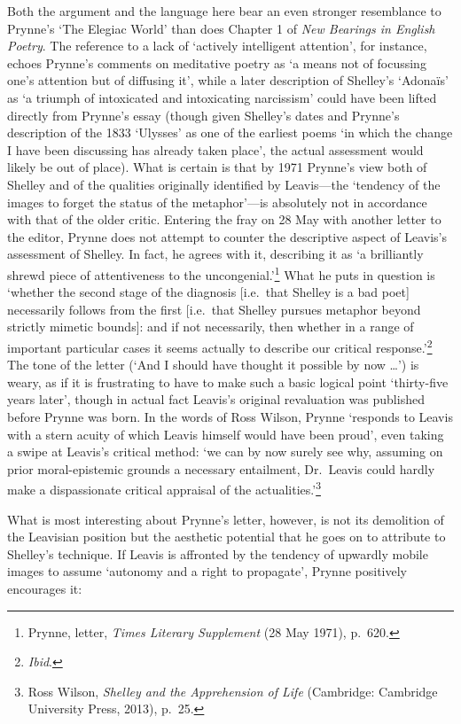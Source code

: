 \documentclass[]{article}
\begin{document}
\noindent Both the argument and the language here bear an even stronger
resemblance to Prynne's `The Elegiac World' than does Chapter 1 of
\emph{New Bearings in English Poetry}. The reference to a lack of
`actively intelligent attention', for instance, echoes Prynne's comments
on meditative poetry as `a means not of focussing one's attention but of
diffusing it', while a later description of Shelley's `Adonaïs' as `a
triumph of intoxicated and intoxicating narcissism' could have been
lifted directly from Prynne's essay (though given Shelley's dates and
Prynne's description of the 1833 `Ulysses' as one of the earliest poems
`in which the change I have been discussing has already taken place',
the actual assessment would likely be out of place). What is certain is
that by 1971 Prynne's view both of Shelley and of the qualities
originally identified by Leavis---the `tendency of the images to forget
the status of the metaphor'---is absolutely not in accordance with that
of the older critic. Entering the fray on 28 May with another letter to
the editor, Prynne does not attempt to counter the descriptive aspect of
Leavis's assessment of Shelley. In fact, he agrees with it, describing
it as `a brilliantly shrewd piece of attentiveness to the
uncongenial.'\footnote{Prynne, letter, \emph{Times Literary Supplement}
  (28 May 1971), p.~620.} What he puts in question is `whether the
second stage of the diagnosis {[}i.e.~that Shelley is a bad poet{]}
necessarily follows from the first {[}i.e.~that Shelley pursues metaphor
beyond strictly mimetic bounds{]}: and if not necessarily, then whether
in a range of important particular cases it seems actually to describe
our critical response.'\footnote{\emph{Ibid}.} The tone of the letter
(`And I should have thought it possible by now \ldots{}') is weary, as
if it is frustrating to have to make such a basic logical point
`thirty-five years later', though in actual fact Leavis's original
revaluation was published before Prynne was born. In the words of Ross
Wilson, Prynne `responds to Leavis with a stern acuity of which Leavis
himself would have been proud', even taking a swipe at Leavis's critical
method: `we can by now surely see why, assuming on prior moral-epistemic
grounds a necessary entailment, Dr.~Leavis could hardly make a
dispassionate critical appraisal of the actualities.'\footnote{Ross
  Wilson, \emph{Shelley and the Apprehension of Life} (Cambridge:
  Cambridge University Press, 2013), p.~25.}

What is most interesting about Prynne's letter, however, is not its
demolition of the Leavisian position but the aesthetic potential that he
goes on to attribute to Shelley's technique. If Leavis is affronted by
the tendency of upwardly mobile images to assume `autonomy and a right
to propagate', Prynne positively encourages it:
\end{document}
